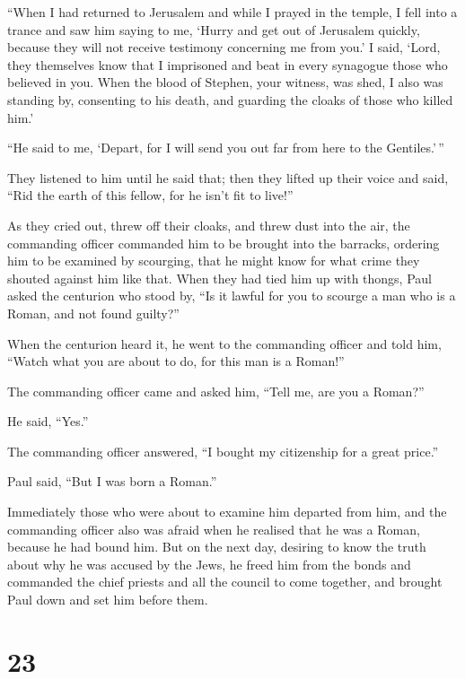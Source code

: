  ``When I had returned to Jerusalem and while I prayed in
the temple, I fell into a trance  and saw him saying to
me, `Hurry and get out of Jerusalem quickly, because they will not
receive testimony concerning me from you.'  I said,
`Lord, they themselves know that I imprisoned and beat in every
synagogue those who believed in you.  When the blood of
Stephen, your witness, was shed, I also was standing by, consenting to
his death, and guarding the cloaks of those who killed him.'

 ``He said to me, `Depart, for I will send you out far
from here to the Gentiles.'\,''

 They listened to him until he said that; then they
lifted up their voice and said, ``Rid the earth of this fellow, for he
isn't fit to live!''

 As they cried out, threw off their cloaks, and threw
dust into the air,  the commanding officer commanded him
to be brought into the barracks, ordering him to be examined by
scourging, that he might know for what crime they shouted against him
like that.  When they had tied him up with thongs, Paul
asked the centurion who stood by, ``Is it lawful for you to scourge a
man who is a Roman, and not found guilty?''

 When the centurion heard it, he went to the commanding
officer and told him, ``Watch what you are about to do, for this man is
a Roman!''

 The commanding officer came and asked him, ``Tell me,
are you a Roman?''

He said, ``Yes.''

 The commanding officer answered, ``I bought my
citizenship for a great price.''

Paul said, ``But I was born a Roman.''

 Immediately those who were about to examine him departed
from him, and the commanding officer also was afraid when he realised
that he was a Roman, because he had bound him.  But on
the next day, desiring to know the truth about why he was accused by the
Jews, he freed him from the bonds and commanded the chief priests and
all the council to come together, and brought Paul down and set him
before them.

\hypertarget{section-22}{%
\section{23}\label{section-22}}


